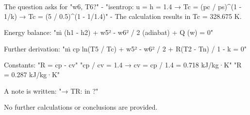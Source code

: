 The question asks for "w6, T6?"  
- "isentrop: u = h = 1.4 → Tc = (pc / ps)^(1 - 1/k) → Tc = (5 / 0.5)^(1 - 1/1.4)"  
- The calculation results in Tc = 328.675 K.  

Energy balance:  
"ṁ (h1 - h2) + w5² - w6² / 2 (adiabat) + Q (w) = 0"  

Further derivation:  
"ṁ cp ln(T5 / Tc) + w5² - w6² / 2 + R(T2 - Tn) / 1 - k = 0"  

Constants:  
"R = cp - cv"  
"cp / cv = 1.4 → cv = cp / 1.4 = 0.718 kJ/kg·K"  
"R = 0.287 kJ/kg·K"  

A note is written:  
"→ TR: in ?"  

No further calculations or conclusions are provided.
